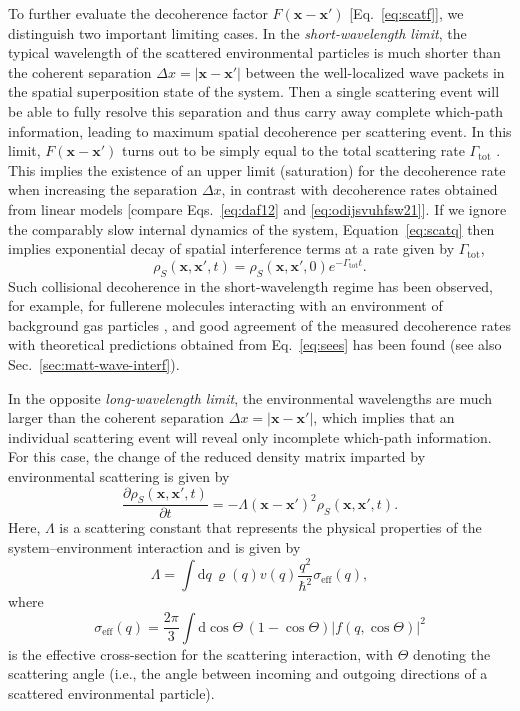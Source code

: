 \documentclass[3p,sort&compress]{elsarticle}
\providecommand{\abs}[1]{\left\lvert#1\right\rvert}
\newcommand{\D}{\ensuremath{\mathrm{d}}}
\newcommand{\E}{\ensuremath{e}}
\renewcommand{\vec}[1]{\ensuremath{\mathbf{#1}}}
\begin{document}
To further evaluate the decoherence factor $F(\vec{x} - \vec{x}')$ [Eq.~\eqref{eq:scatf}], we distinguish two important limiting cases. In the \emph{short-wavelength limit}, the typical wavelength of the scattered environmental particles is much shorter than the coherent separation $\Delta x = \abs{\vec{x}-\vec{x}'}$ between the well-localized wave packets in the spatial superposition state of the system. Then a single scattering event will be able to fully resolve this separation and thus carry away complete which-path information, leading to maximum spatial decoherence per scattering event. In this limit, $F(\vec{x} - \vec{x}')$ turns out to be simply equal to the total scattering rate $\Gamma_\text{tot}$ \cite{Schlosshauer:2007:un}. This implies the existence of an upper limit (saturation) for the decoherence rate when increasing the separation $\Delta x$, in contrast with decoherence rates obtained from linear models [compare Eqs.~\eqref{eq:daf12} and \eqref{eq:odijsvuhfsw21}]. If we ignore the comparably slow internal dynamics of the system, Equation~\eqref{eq:scatq} then implies exponential decay of spatial interference terms at a rate given by $\Gamma_\text{tot}$,
%
\begin{equation}\label{eq:sees}
\rho_S(\vec{x},\vec{x}',t) =
\rho_S(\vec{x},\vec{x}',0) \E^{-\Gamma_\text{tot} t}.
\end{equation}
%
Such collisional decoherence in the short-wavelength regime has been observed, for example, for fullerene molecules interacting with an environment of background gas particles \cite{Hackermuller:2003:uu}, and good agreement of the measured decoherence rates with theoretical predictions obtained from Eq.~\eqref{eq:sees} has been found \cite{Hornberger:2003:tv} (see also Sec.~\ref{sec:matt-wave-interf}).

In the opposite \emph{long-wavelength limit}, the environmental wavelengths are much larger than the coherent separation $\Delta x = \abs{\vec{x}-\vec{x}'}$, which implies that an individual scattering event will reveal only incomplete which-path information. For this case, the change of the reduced density matrix imparted by environmental scattering is given by
%
\begin{equation}\label{eq:scwer1} 
  \frac{\partial\rho_S(\vec{x},\vec{x}',t)}{\partial t} = - \Lambda
  (\vec{x} -\vec{x'})^2   \rho_{S}(\vec{x},\vec{x}',t).
\end{equation}
% 
Here, $\Lambda$ is a scattering constant that represents the physical properties of the system--environment interaction and is given by
%
\begin{equation}\label{eq:scatfls2} 
\Lambda =  \int \D q\,  \varrho(q) v(q) 
\frac{q^2}{\hbar^2} \sigma_\text{eff}(q),
\end{equation}
%
where
%
\begin{equation}\label{eq:sccs} 
  \sigma_\text{eff}(q) = \frac{2\pi}{3} \int  \D \cos\Theta \,
  \left(1 - \cos \Theta \right)  \abs{ f(q, \cos\Theta)}^2 
\end{equation}
%
is the effective cross-section for the scattering interaction, with $\Theta$ denoting the scattering angle (i.e., the angle between incoming and outgoing directions of a scattered environmental particle).
\end{document}
